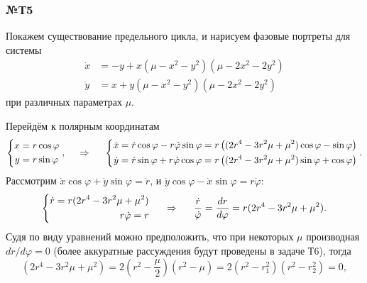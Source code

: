 \subsubsection*{№Т5}
Покажем существование предельного цикла, и нарисуем фазовые портреты для системы 
\begin{align*}
    \dot{x} &= - y + x (\mu - x^2 - y^2)(\mu - 2 x^2 - 2 y^2) \\
    \dot{y} &= x + y (\mu - x^2 - y^2)(\mu - 2 x^2 - 2 y^2)
\end{align*}
 при различных параметрах $\mu$.

Перейдём к полярным координатам
\begin{equation*}
    \left\{\begin{aligned}
        x &= r \cos \varphi \\
        y &= r \sin \varphi
    \end{aligned}\right. ,
    \hspace{0.5cm} \Rightarrow \hspace{0.5cm}
    \left\{\begin{aligned}
        \dot{x} &= \dot{r} \cos \varphi - r \dot{\varphi} \sin \varphi 
        = r \left(
            (2 r^4 - 3 r^2 \mu  +\mu^2) \cos \varphi - \sin \varphi
        \right)
        \\
        \dot{y} &= \dot{r} \sin \varphi + r \dot{\varphi} \cos \varphi 
        = r \left(
            (2 r^4 - 3 r^2 \mu  +\mu^2) \sin \varphi + \cos \varphi
        \right)
    \end{aligned}\right. .
\end{equation*}
Рассмотрим $\dot{x} \cos \varphi + \dot{y} \sin \varphi = \dot{r}$, и $\dot{y} \cos \varphi - \dot{x} \sin \varphi = r \dot{\varphi}$:
\begin{equation*}
    \left\{\begin{aligned}
        \dot{r} = r (2 r^4 - 3 r^2 \mu + \mu^2) \\
        r \dot{\varphi} = r
    \end{aligned}\right.
    \hspace{0.5cm} \Rightarrow \hspace{0.5cm}
    \frac{\dot{r}}{\dot{\varphi}} = \frac{d r}{d \varphi} = r (2 r^4 - 3 r^2 \mu + \mu^2).
\end{equation*}
Судя по виду уравнений можно предположить, что при некоторых $\mu$ производная $dr / d\varphi = 0$ (более аккуратные рассуждения будут проведены в задаче Т6), тогда
\begin{equation*}
    (2 r^4 - 3 r^2 \mu + \mu^2) = 
    2 \left(r^2 - \frac{\mu}{2}\right) \left(r^2 - \mu\right) = 
    2 \left(r^2 - r_1^2\right) \left(r^2 - r_2^2\right)
    = 0,
\end{equation*}
